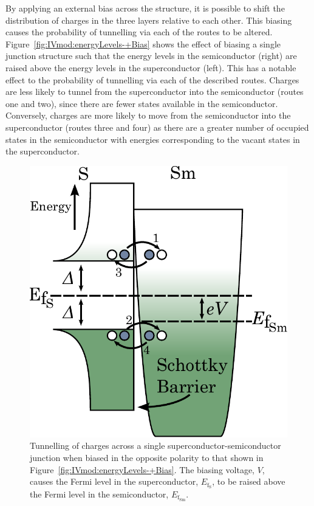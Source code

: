 \par
By applying an external bias across the structure, it is possible to shift the distribution of charges in the three layers relative to each other. This biasing causes the probability of tunnelling via each of the routes to be altered. Figure~\ref{fig:IVmod:energyLevels-+Bias} shows the effect of biasing a single junction structure such that the energy levels in the semiconductor (right) are raised above the energy levels in the superconductor (left). This has a notable effect to the probability of tunnelling via each of the described routes. Charges are less likely to tunnel from the superconductor into the semiconductor (routes one and two), since there are fewer states available in the semiconductor. Conversely, charges are more likely to move from the semiconductor into the superconductor (routes three and four) as there are a greater number of occupied states in the semiconductor with energies corresponding to the vacant states in the superconductor.
\begin{figure}[t]
\begin{center}
\includegraphics[height = 0.5\textheight]{figures/CEB_energyLevels_-veBias}
\caption[Tunnelling in of charges across a negatively biased device]{Tunnelling of charges across a single superconductor-semiconductor junction when biased in the opposite polarity to that shown in Figure~\ref{fig:IVmod:energyLevels-+Bias}. The biasing voltage, $V$, causes the Fermi level in the superconductor, $E_{\mathrm{f_{S}}}$, to be raised above the Fermi level in the semiconductor, $E_{\mathrm{f_{Sm}}}$.}
\label{fig:IVmod:energyLevels--Bias}
\end{center}
\end{figure}
